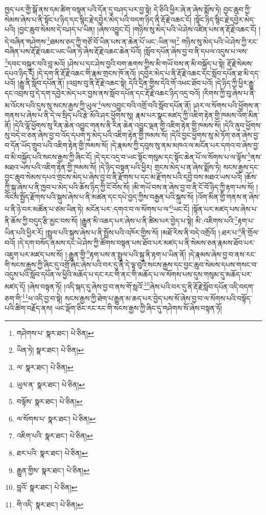 ཁྱད་པར་གྱི་སྒོ་ནས་དམ་ཚིག་བསྟན་པའི་དོན་དུ་བཤད་པར་བྱ་སྟེ། དེ་ཅིའི་ཕྱིར་ཞེ་ན་ཞེས་སྨོས་ཏེ། བྱང་ཆུབ་ཀྱི་སེམས་ཞེས་པ་ནི་སྟོང་པ་ཉིད་དང་སྙིང་རྗེ་དབྱེར་མེད་པའི་བདག་ཉིད་ནི་རྡོ་རྗེ་འཆང་ངོ། །སྟོང་ཉིད་སྙིང་རྗེ་དབྱེར་མེད་པའི། །བྱང་ཆུབ་སེམས་དེ་བཤད་པ་ཡིན། །ཞེས་འབྱུང་ངོ། །གཉིས་སུ་མེད་པའི་ཡེ་ཤེས་འཛིན་པས་ན་རྡོ་རྗེ་འཆང་ངོ། །དེ་བཞིན་གཤེགས་\footnote{གཤེགས་པ་  སྣར་ཐང་།  པེ་ཅིན། }ཐམས་ཅད་ཀྱི་གཙོ་བོ་ཡིན་པས་ན་ཆེན་པོ་ཡང་:ཡིན་ལ།\footnote{ཡིན་ཏེ།  སྣར་ཐང་།  པེ་ཅིན། } གཉིས་སུ་མེད་པའི་ཡེ་ཤེས་ཀྱི་རང་བཞིན་པས་རྡོ་རྗེ་འཆང་ཡང་ཡིན་ཏེ་ཞེས་རྡོ་རྗེ་འཆང་ཆེན་པོའོ། །སློབ་དཔོན་ཞེས་བྱ་བ་ནི་དཔལ་འདུས་པ་ལས་\footnote{ལ་  སྣར་ཐང་།  པེ་ཅིན། }དབང་བསྐུར་བའི་བླ་མའོ། །ཤེས་པ་དང་ཤེས་བྱའི་བག་ཆགས་ཀྱིས་མི་གཡོ་བས་ན་མི་བསྐྱོད་པ་སྟེ། རྡོ་རྗེ་སེམས་དཔའ་ཉིད་དོ། །དེ་དག་ནི་རྡོ་རྗེ་འཆང་གི་རྣམ་གྲངས་ཁོ་ནའོ། །དབྱེར་མེད་པ་ནི་རྡོ་རྗེ་འཆང་དང་སློབ་དཔོན་ཐ་མི་དད་པའོ། །རྒྱུ་ནི་སློབ་དཔོན་ནོ། །འབྲས་བུ་ནི་རྡོ་རྗེ་འཆང་སྟེ། དེའི་དྲིན་གྱིས་དེའི་གོ་འཕང་ཐོབ་པའོ། །དེ་ཉིད་ཀྱི་ཕྱིར་རྒྱུ་དང་འབྲས་བུ་དེ་དག་དབྱེར་མེད་པར་བྱས་ནས་སློབ་དཔོན་དང་རྡོ་རྗེ་འཆང་ཉིད་འདྲ་བའོ། །རིགས་ཀྱི་བུ་ཞེས་པ་ནི་མ་འོངས་པའི་དུས་སུ་སངས་རྒྱས་ཀྱི་ཡུལ་\footnote{ཡུལ་ན་  སྣར་ཐང་།  པེ་ཅིན། }ལས་འབྱུང་བའི་འགྲོ་བའི་སློབ་དཔོན་ནོ། །ཤར་ལ་སོགས་པའི་ཕྱོགས་ན་གནས་པ་ཞེས་པ་ནི་དེ་ལ་སྲིད་པའི་རྩེ་མོའི་ཤར་ཕྱོགས་སུ། རྣམ་པར་སྣང་མཛད་ཀྱི་འཇིག་རྟེན་གྱི་ཁམས་འོག་མིན་ནོ། །དེའི་ལྷོ་ཕྱོགས་སུ་རིན་ཆེན་འབྱུང་གནས་ནི་རིན་ཆེན་འབྱུང་ལྡན་གྱི་འཇིག་རྟེན་གྱི་ཁམས་སོ། །དེའི་ནུབ་ཕྱོགས་སུ་བདེ་བ་ཅན་ཞེས་བྱ་བ་འོད་དཔག་ཏུ་མེད་པའི་འཇིག་རྟེན་གྱི་ཁམས་སོ། །དེའི་བྱང་ཕྱོགས་སུ་མེ་ཏོག་ཅན་ཞེས་བྱ་བ་དོན་ཡོད་གྲུབ་པའི་འཇིག་རྟེན་གྱི་ཁམས་སོ། །དེ་རྣམས་ཀྱི་དབུས་སུ་ནམ་མཁའ་ལ་མངོན་པར་དགའ་བ་ཞེས་བྱ་བ་མི་བསྐྱོད་པའི་སངས་རྒྱས་ཀྱི་ཞིང་ངོ། །དེ་དང་འདྲ་བ་ཡང་སྟོང་གསུམ་དང་སྟོང་ཆེན་པོ་ལ་སོགས་པ་ལ་ལྟོས་\footnote{བལྟོས་  སྣར་ཐང་།  པེ་ཅིན། }ནས་མཐའ་ཡས་པའི་འཇིག་རྟེན་གྱི་ཁམས་སོ། །དེ་ཉིད་བསྟན་པའི་ཕྱིར། གྲངས་མེད་པ་ན་ཞེས་སྨོས་ཏེ། སངས་རྒྱས་དང་བྱང་ཆུབ་སེམས་དཔའ་གྲངས་མེད་པ་ཞེས་བྱ་བ་ནི་རྫོགས་པ་དང་མ་རྫོགས་པའི་དབྱེ་བས་མཐའ་ཡས་པའོ། །ཆོས་ཀྱི་སྐུ་ཞེས་པ་ནི་ཁྱབ་པ་མེད་པའི་ཆོས་ཉིད་ཀྱི་ངོ་བོས་སོ། །མི་གཡོ་བས་ན་ཞེས་བྱ་བ་ནི་ངོ་བོ་ཉིད་ཀྱི་རྟག་པས་སོ། །ལོངས་སྤྱོད་རྫོགས་པའི་སྐུས་ཞེས་པ་ནི་མཚན་དང་དཔེ་བྱད་ཀྱིས་བརྒྱན་པའི་སྐུས་སོ། །འོག་མིན་གྱི་གནས་ན་ཞེས་པ་ནི་ཉེ་བར་མཚོན་པ་ཙམ་ཡིན་ཏེ། མངོན་པར་:དགའ་བ་ལ་སོགས་པ་ལ་\footnote{ལ་སོགས་པ་  སྣར་ཐང་།  པེ་ཅིན། }ཡང་ངོ། །སྟོན་པར་མཛད་པས་ཞེས་པ་ནི་ཆོས་ཀྱི་བདུད་རྩི་མྱང་བས་སོ། །རྒྱུན་མི་འཆད་པར་ཞེས་པ་ནི་ཚིམ་པར་བྱེད་པ་སྟེ། མི་:འཇིགས་པའི་\footnote{འཇིག་པའི་  སྣར་ཐང་།  པེ་ཅིན། }རྟག་པ་ཡིན་པའི་ཕྱིར་རོ། །སྤྲུལ་པའི་སྐུས་ཞེས་པ་ནི་སྤྲོས་པའི་འཁོར་གྱིས་སོ། །མཐོ་རིས་ནི་བདེ་འགྲོའོ། །:ཐར་པ་\footnote{ཐར་པའི་  སྣར་ཐང་།  པེ་ཅིན། }ནི་གྲོལ་བའོ། །དེ་དག་བསོད་ནམས་དང་ཡེ་ཤེས་ཀྱི་ཚོགས་བསྟན་པས་ཐོབ་པར་མཛད་པ་ནི་སེམས་ཅན་རྣམས་ཐོབ་པར་འཇུག་པར་མཛད་པས་སོ། །:རྒྱུན་གྱི་\footnote{རྒྱུན་གྱིས་  སྣར་ཐང་།  པེ་ཅིན། }རྟག་པས་ན་སྤྲུལ་པའི་སྐུ་ནི་རྟག་པ་ཡིན་ནོ། །དེ་རྣམས་ཞེས་བྱ་བ་ནས་རང་གི་སངས་རྒྱས་ཀྱི་ཞིང་དུ་འགྲོ་ཞིང་ཞེས་པའི་བར་དུ་ནི་དེ་ལྟ་བུའི་སངས་རྒྱས་དང་བྱང་ཆུབ་སེམས་དཔས་གསང་བ་འདུས་པའི་སློབ་དཔོན་ལ་ཕྱིའི་མཆོད་པ་དང་རང་གི་ནང་གི་མཆོད་པ་ལ་སོགས་པས་དུས་གསུམ་དུ་མཆོད་པར་མཛད་དོ། །ཞེས་བསྟན་ཏོ། །འདི་སྐད་དུ་ཞེས་བྱ་བ་ནས་གོ་སླའོ་\footnote{བླའོ་  སྣར་ཐང་།  པེ་ཅིན། }ཞེས་པའི་བར་དུ་ནི་རྡོ་རྗེ་སློབ་དཔོན་འདི་བདག་ཅག་གི་\footnote{གི་འདི་  སྣར་ཐང་།  པེ་ཅིན། }ཕ་འདི་བྱ་བ་སྟེ། སངས་རྒྱས་ཀྱི་ཐེག་པ་རྒྱུན་མ་ཆད་པར་བྱེད་པས་སོ་ཞེས་བྱ་བ་ལ་སོགས་པའི་བསྟོད་པའི་ཚིག་བརྗོད་ནས། ཡང་ལྡོག་ཅིང་རང་རང་གི་སངས་རྒྱས་ཀྱི་ཞིང་དུ་གཤེགས་སོ་ཞེས་བསྟན་ཏོ། 